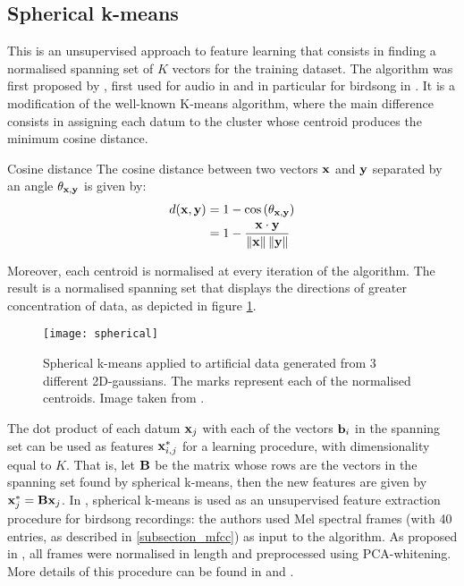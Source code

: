 \documentclass[../main.tex]{subfiles} \label{chapter_soa}
\begin{document}
\subsection{Spherical k-means} \label{subsection_spherical}
This is an unsupervised approach to feature learning that consists in finding a normalised spanning set of $K$ vectors for the training dataset. The algorithm was first proposed by \cite{Coates2012}, first used for audio in \cite{Dieleman2013} and in particular for birdsong in \cite{Stowell2014}. It is a modification of the well-known K-means algorithm, where the main difference consists in assigning each datum to the cluster whose centroid produces the minimum cosine distance.
\begin{definition}{Cosine distance} \label{def_cosine_distance}
The cosine distance between two vectors $\mathbf{x}$ and $\mathbf{y}$ separated by an angle $\theta_{\mathbf{x}, \mathbf{y}}$ is given by:
\begin{align*}
d(\mathbf{x}, \mathbf{y}) &= 1 - \cos{(\theta_{\mathbf{x}, \mathbf{y}})}\\
&= 1 - \frac{\mathbf{x} \cdot \mathbf{y}}{\left\lVert\mathbf{x}\right\rVert\left\lVert\mathbf{y}\right\rVert}
\end{align*}
\end{definition}
\par Moreover, each centroid is normalised at every iteration of the algorithm. The result is a normalised spanning set that displays the directions of greater concentration of data, as depicted in figure \ref{fig_spherical}.

\begin{figure}[t]
\centering
\texttt{[image: spherical]}
\caption{Spherical k-means applied to artificial data generated from 3 different 2D-gaussians. The marks represent each of the normalised centroids. Image taken from \cite{Stowell2014}.}
\label{fig_spherical}
\end{figure}
\par The dot product of each datum $\mathbf{x}_j$ with each of the vectors $\mathbf{b}_i$ in the spanning set can be used as features $\mathbf{x}^*_{i,j}$ for a learning procedure, with dimensionality equal to $K$. That is, let $\mathbf{B}$ be the matrix whose rows are the vectors in the spanning set found by spherical k-means, then the new features are given by $\mathbf{x}^*_j = \mathbf{Bx}_j$. In \cite{Stowell2014}, spherical k-means is used as an unsupervised feature extraction procedure for birdsong recordings: the authors used Mel spectral frames (with 40 entries, as described in \ref{subsection_mfcc}) as input to the algorithm. As proposed in \cite{Dieleman2013}, all frames were normalised in length and preprocessed using PCA-whitening. More details of this procedure can be found in \cite{Stowell2014} and \cite{Dieleman2013}.
\end{document}
